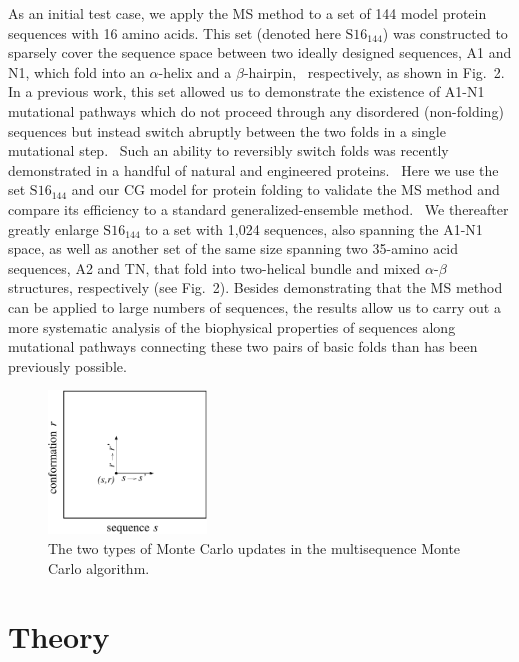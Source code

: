 \documentclass[
aip,
rsi,%
amsmath,amssymb,
reprint,%
]{revtex4-1}
\newcommand {\SR}		{${\mathrm{S16}_{144}}$}
\begin{document}

As an initial test case, we apply the MS method to a set of 144 model protein sequences with 16 amino acids. This set (denoted here {\SR}) was constructed to sparsely cover the sequence space between two ideally designed sequences, A1 and N1, which fold into an $\alpha$-helix and a $\beta$-hairpin,~\cite{Bhattacherjee2012} respectively, as shown in Fig.~2. In a previous work, this set allowed us to demonstrate the existence of A1-N1 mutational pathways which do not proceed through any disordered (non-folding) sequences but instead switch abruptly between the two folds in a single mutational step.~\cite{Holzgrafe2014} Such an ability to reversibly switch folds was recently demonstrated in a handful of natural and engineered proteins.~\cite{Bryan2010} Here we use the set {\SR} and our CG model for protein folding to validate the MS method and compare its efficiency to a standard generalized-ensemble method.~\cite{Marinari1992,Lyubartsev1992} We thereafter greatly enlarge {\SR} to a set with 1,024 sequences, also spanning the A1-N1 space, as well as another set of the same size spanning two 35-amino acid sequences, A2 and TN, that fold into two-helical bundle and mixed $\alpha$-$\beta$ structures, respectively (see Fig.~2). Besides demonstrating that the MS method can be applied to large numbers of sequences, the results allow us to carry out a more systematic analysis of the biophysical properties of sequences along mutational pathways connecting these two pairs of basic folds than has been previously possible. 

\begin{figure}
\includegraphics[width=4.2cm]{Fig1}
\caption{The two types of Monte Carlo updates in the multisequence Monte Carlo algorithm.}
\end{figure}

\section{Theory}
\end{document}
